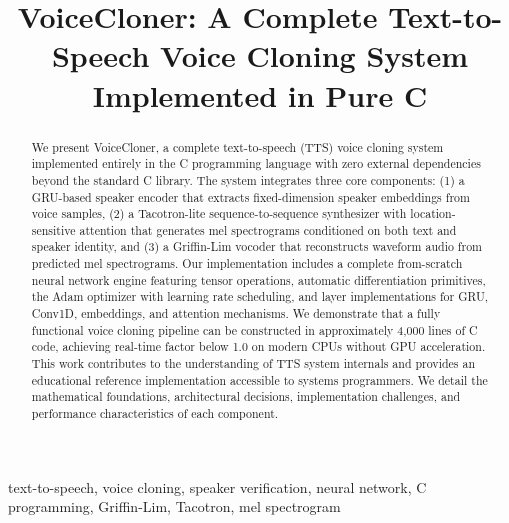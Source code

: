\documentclass[conference]{IEEEtran}
\begin{document}
\title{VoiceCloner: A Complete Text-to-Speech Voice Cloning System Implemented in Pure C}

\author{
}

\maketitle

\begin{abstract}
We present VoiceCloner, a complete text-to-speech (TTS) voice cloning system implemented entirely in the C programming language with zero external dependencies beyond the standard C library. The system integrates three core components: (1) a GRU-based speaker encoder that extracts fixed-dimension speaker embeddings from voice samples, (2) a Tacotron-lite sequence-to-sequence synthesizer with location-sensitive attention that generates mel spectrograms conditioned on both text and speaker identity, and (3) a Griffin-Lim vocoder that reconstructs waveform audio from predicted mel spectrograms. Our implementation includes a complete from-scratch neural network engine featuring tensor operations, automatic differentiation primitives, the Adam optimizer with learning rate scheduling, and layer implementations for GRU, Conv1D, embeddings, and attention mechanisms. We demonstrate that a fully functional voice cloning pipeline can be constructed in approximately 4,000 lines of C code, achieving real-time factor below 1.0 on modern CPUs without GPU acceleration. This work contributes to the understanding of TTS system internals and provides an educational reference implementation accessible to systems programmers. We detail the mathematical foundations, architectural decisions, implementation challenges, and performance characteristics of each component.
\end{abstract}

\begin{IEEEkeywords}
text-to-speech, voice cloning, speaker verification, neural network, C programming, Griffin-Lim, Tacotron, mel spectrogram
\end{IEEEkeywords}

\end{document}
